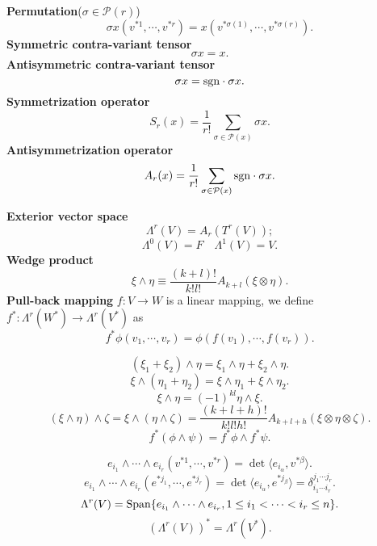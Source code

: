 \begin{newdef}
\textbf{Permutation}($\sigma \in \mathcal{P}(r)$)
\[\sigma x(v^{*1},\cdots,v^{*r})=x(v^{*\sigma(1)},\cdots,v^{*\sigma(r)}).\]
\textbf{Symmetric contra-variant tensor}
\[\sigma x =x.\]
\textbf{Antisymmetric contra-variant tensor}
\[\sigma x ={\rm sgn } \cdot \sigma x.\]
\textbf{Symmetrization operator}
\[S_r(x) = \frac{1}{r!} \sum_{\sigma \in \mathcal{P}(x)} \sigma x.\]
\textbf{Antisymmetrization operator}
\[A_r(x) = \frac{1}{r!} \sum_{\sigma \in \mathcal{P}(x)} {\rm sgn }\cdot \sigma x.\]
\end{newdef}

\begin{newdef}
\textbf{Exterior vector space}
\[\Lambda^r(V) = A_r(T^r(V));\]
\[\Lambda^0(V)=F \quad \Lambda^1(V)=V.\]
\textbf{Wedge product}
\[\xi \wedge \eta \equiv \frac{(k+l)!}{k!l!}A_{k+l}(\xi \otimes \eta).\]
\textbf{Pull-back mapping}
$f:V \to W$ is a linear mapping, we define $f^*:\Lambda^r(W^*) \to \Lambda^r(V^*)$ as
\[f^* \phi(v_1,\cdots,v_r) = \phi(f(v_1),\cdots,f(v_r)).\]
\end{newdef}

\begin{newprop}
\[(\xi_1+\xi_2) \wedge \eta = \xi_1 \wedge \eta + \xi_2 \wedge \eta.\]
\[\xi \wedge (\eta_1+\eta_2) = \xi \wedge \eta_1 + \xi \wedge \eta_2.\]
\[\xi \wedge \eta = (-1)^{kl} \eta \wedge \xi.\]
\[(\xi \wedge \eta) \wedge \zeta = \xi \wedge (\eta \wedge \zeta) = \frac{(k+l+h)!}{k!l!h!}A_{k+l+h}(\xi \otimes \eta \otimes \zeta).\]
\[f^*(\phi \wedge \psi) = f^*\phi \wedge f^*\psi.\]
\end{newprop}

\begin{newprop}
\[e_{i_1} \wedge \cdots \wedge e_{i_r}(v^{*1},\cdots,v^{*r}) = \det \langle e_{i_{\alpha}},v^{*\beta} \rangle.\]
\[e_{i_1} \wedge \cdots \wedge e_{i_r}(e^{*j_1},\cdots,e^{*j_r}) = \det \langle e_{i_{\alpha}},e^{*j_{\beta}} \rangle = \delta^{j_1 \cdots j_r}_{i_1 \cdots i_r}.\]
\[\Lambda^r(V) = {\rm Span }\{e_{i_1} \wedge \cdots \wedge e_{i_r},1\leq i_1 < \cdots < i_r \leq n  \}.\]
\[(\Lambda^r(V))^* = \Lambda^r(V^*).\]
\end{newprop}

